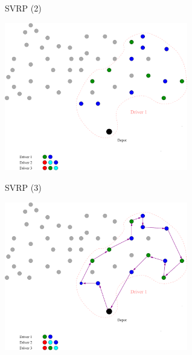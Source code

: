 \documentclass[10pt]{beamer}
\begin{document}
\begin{frame}[t]{SVRP (2)}
    \begin{example}
        \begin{center}
            \includegraphics[width=8cm]{VRPSS02.pdf} 
        \end{center}
    \end{example}
\end{frame}

\begin{frame}[t]{SVRP (3)}
    \begin{example}
        \begin{center}
            \includegraphics[width=8cm]{VRPSS03.pdf} 
        \end{center}
    \end{example}
\end{frame}

\end{document}
